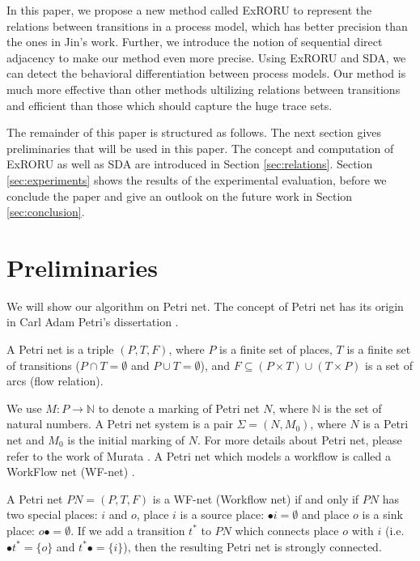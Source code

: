 \documentclass[dvips,...]{llncs}
\begin{document}
In this paper, we propose a new method called ExRORU to represent the relations between transitions in a process model, which has better precision than the ones in Jin's work. Further, we introduce the notion of sequential direct adjacency to make our method even more precise. Using ExRORU and SDA, we can detect the behavioral differentiation between process models. Our method is much more effective than other methods ultilizing relations between transitions and efficient than those which should capture the huge trace sets.

The remainder of this paper is structured as follows. The next section gives preliminaries that will be used in this paper. The concept and computation of ExRORU as well as SDA are introduced in Section \ref{sec:relations}. Section \ref{sec:experiments} shows the results of the experimental evaluation, before we conclude the paper and give an outlook on the future work in Section \ref{sec:conclusion}.

\section{Preliminaries}\label{sec:preliminaries}
We will show our algorithm on Petri net. The concept of Petri net has its origin in Carl Adam Petri's dissertation \cite{petri1966kommunikation}.

\begin{definition}\label{def:petrinet}
A Petri net is a triple $(P,T,F)$, where $P$ is a finite set of places, $T$ is a finite set of transitions ($P\cap T=\emptyset$ and $P\cup T=\emptyset$), and $F\subseteq(P\times T)\cup(T\times P)$ is a set of arcs (flow relation).
\end{definition}

We use $M:P\rightarrow\mathbb{N}$ to denote a marking of Petri net $N$, where $\mathbb{N}$ is the set of natural numbers. A Petri net system is a pair $\Sigma=(N,M_{0})$, where $N$ is a Petri net and $M_{0}$ is the initial marking of $N$. For more details about Petri net, please refer to the work of Murata \cite{murata1989petri}. A Petri net which models a workflow is called a WorkFlow net (WF-net) \cite{van1998application}.

\begin{definition}[WF-net]\label{def:wfnet}
A Petri net $PN=(P,T,F)$ is a WF-net (Workflow net) if and only if $PN$ has two special places: $i$ and $o$, place $i$ is a source place: $\bullet i=\emptyset$ and place $o$ is a sink place: $o\bullet =\emptyset$. If we add a transition $t^{*}$ to $PN$ which connects place $o$ with $i$ (i.e. $\bullet t^{*}=\{o\}$ and $t^{*}\bullet=\{i\}$), then the resulting Petri net is strongly connected.
\end{definition}
\end{document}
